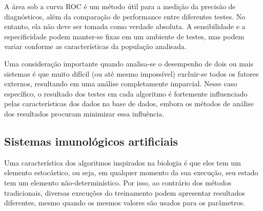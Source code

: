 A área sob a curva ROC é um método útil para a medição da precisão de diagnósticos, além da comparação de performance entre diferentes testes. No entanto, ela não deve ser tomada como verdade absoluta. A sensibilidade e a especificidade podem manter-se fixas em um ambiente de testes, mas podem variar conforme as características da população analisada.

Uma consideração importante quando analisa-se o desempenho de dois ou mais sistemas é que muito difícil (ou até mesmo impossível) excluir-se todos os fatores externos, resultando em uma análise completamente imparcial. Nesse caso específico, o resultado dos testes em cada algoritmo é fortemente influenciado pelas características dos dados na base de dados, embora os métodos de análise dos resultados procuram minimizar essa influência.

\subsection{Sistemas imunológicos artificiais}

Uma característica dos algoritmos inspirados na biologia é que eles tem um elemento estocástico, ou seja, em qualquer momento da sua execução, seu estado tem um elemento não-determinístico. Por isso, ao contrário dos métodos tradicionais, diversas execuções do treinamento podem apresentar resultados diferentes, mesmo quando os mesmos valores são usados para os parâmetros.
